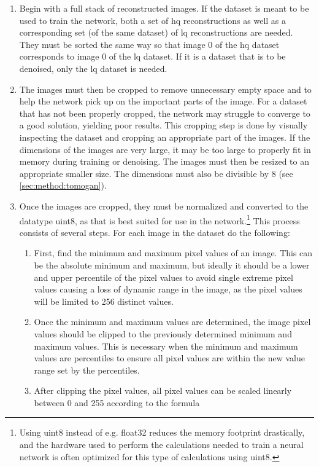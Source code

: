 \begin{enumerate}
    \item Begin with a full stack of reconstructed images. If the dataset is meant to be used to train the network, both a set of \gls{hq} reconstructions as well as a corresponding set (of the same dataset) of \gls{lq} reconstructions are needed. They must be sorted the same way so that image 0 of the \gls{hq} dataset corresponds to image 0 of the \gls{lq} dataset. If it is a dataset that is to be denoised, only the \gls{lq} dataset is needed. 
    \item The images must then be cropped to remove unnecessary empty space and to help the network pick up on the important parts of the image. For a dataset that has not been properly cropped, the network may struggle to converge to a good solution, yielding poor results. This cropping step is done by visually inspecting the dataset and cropping an appropriate part of the images. If the dimensions of the images are very large, it may be too large to properly fit in memory during training or denoising. The images must then be resized to an appropriate smaller size. The dimensions must also be divisible by $8$ (see \cref{sec:method:tomogan}).
    \item Once the images are cropped, they must be normalized and converted to the datatype uint8, as that is best suited for use in the network.\footnote{Using uint8 instead of e.g. float32 reduces the memory footprint drastically, and the hardware used to perform the calculations needed to train a neural network is often optimized for this type of calculations using uint8. } This process consists of several steps. For each image in the dataset do the following:
    \begin{enumerate}
        \item First, find the minimum and maximum pixel values of an image. This can be the absolute minimum and maximum, but ideally it should be a lower and upper percentile of the pixel values to avoid single extreme pixel values causing a loss of dynamic range in the image, as the pixel values will be limited to 256 distinct values. 
        \item Once the minimum and maximum values are determined, the image pixel values should be clipped to the previously determined minimum and maximum values. This is necessary when the minimum and maximum values are percentiles to ensure all pixel values are within the new value range set by the percentiles.
        \item After clipping the pixel values, all pixel values can be scaled linearly between 0 and 255 according to the formula 

\end{enumerate}
\end{enumerate}
